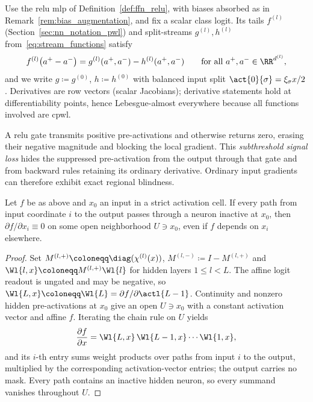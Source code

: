 Use the \ac{relu} \ac{mlp} of Definition~\ref{def:ffn_relu}, with biases absorbed as in Remark~\ref{rem:bias_augmentation}, and fix a scalar class logit. Its tails $f^{(l)}$ (Section~\ref{sec:nn_notation_pwl}) and split-streams $g^{(l)},h^{(l)}$ from~\eqref{eq:stream_functions} satisfy
\begin{equation}
	f^{(l)}\bigl(a^{+} - a^{-}\bigr) = g^{(l)}(a^{+}, a^{-}) - h^{(l)}(a^{+}, a^{-})
	\qquad \text{for all } a^{+}, a^{-} \in \RR^{d^{(l)}},
	\label{eq:split_correctness_recall}
\end{equation}
and we write $g\coloneqq g^{(0)}$, $h\coloneqq h^{(0)}$ with balanced input split $\act{0}{\sigma}=\xi_\sigma x/2$. Derivatives are row vectors (scalar Jacobians); derivative statements hold at differentiability points, hence Lebesgue-almost everywhere because all functions involved are \ac{cpwl}.

A \ac{relu} gate transmits positive pre-activations and otherwise returns zero, erasing their negative magnitude and blocking the local gradient. This \emph{subthreshold signal loss} hides the suppressed pre-activation from the output through that gate and from backward rules retaining its ordinary derivative. Ordinary input gradients can therefore exhibit exact regional blindness.

\begin{proposition}\label{prop:gradient_blindness}
Let $f$ be as above and $x_0$ an input in a strict activation cell. If every path from input coordinate $i$ to the output passes through a neuron inactive at $x_0$, then $\partial f/\partial x_i\equiv0$ on some open neighborhood $U\ni x_0$, even if $f$ depends on $x_i$ elsewhere.\end{proposition}

\begin{proof}
Set $M^{(l,+)}\coloneqq\diag(\chi^{(l)}(x))$, $M^{(l,-)}\coloneqq I-M^{(l,+)}$ and $\Wl{l,x}\coloneqq M^{(l,+)}\Wl{l}$ for hidden layers $1\leq l<L$. The affine logit readout is ungated and may be negative, so $\Wl{L,x}\coloneqq\Wl{L}=\partial f/\partial\actl{L-1}$. Continuity and nonzero hidden pre-activations at $x_0$ give an open $U\ni x_0$ with a constant activation vector and affine $f$. Iterating the chain rule on $U$ yields
\begin{equation}
	\frac{\partial f}{\partial x}
	= \Wl{L,x} \, \Wl{L-1,x} \cdots \Wl{1,x},
	\label{eq:masked_path_product}
\end{equation}
and its $i$-th entry sums weight products over paths from input $i$ to the output, multiplied by the corresponding activation-vector entries; the output carries no mask. Every path contains an inactive hidden neuron, so every summand vanishes throughout $U$.
\end{proof}


